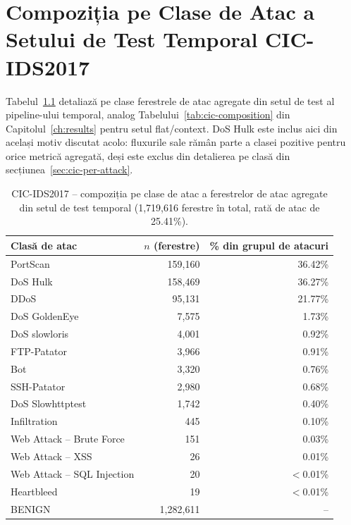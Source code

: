 \chapter{Compoziția pe Clase de Atac a Setului de Test Temporal CIC-IDS2017}
\label{ch:cic-composition-temporal}

Tabelul~\ref{tab:cic-composition-temporal} detaliază pe clase ferestrele de atac agregate din setul de test al pipeline-ului temporal, analog Tabelului~\ref{tab:cic-composition} din Capitolul~\ref{ch:results} pentru setul flat/context. DoS Hulk este inclus aici din același motiv discutat acolo: fluxurile sale rămân parte a clasei pozitive pentru orice metrică agregată, deși este exclus din detalierea pe clasă din secțiunea~\ref{sec:cic-per-attack}.

\begin{table}[H]
\centering
\begin{tabular}{@{}lrr@{}}
\toprule
Clasă de atac & $n$ (ferestre) & \% din grupul de atacuri \\
\midrule
PortScan            & 159{,}160 & 36.42\% \\
DoS Hulk            & 158{,}469 & 36.27\% \\
DDoS                & 95{,}131  & 21.77\% \\
DoS GoldenEye       & 7{,}575   & 1.73\%  \\
DoS slowloris       & 4{,}001   & 0.92\%  \\
FTP-Patator         & 3{,}966   & 0.91\%  \\
Bot                 & 3{,}320   & 0.76\%  \\
SSH-Patator         & 2{,}980   & 0.68\%  \\
DoS Slowhttptest    & 1{,}742   & 0.40\%  \\
Infiltration        & 445       & 0.10\%  \\
Web Attack -- Brute Force & 151 & 0.03\%  \\
Web Attack -- XSS    & 26        & 0.01\%  \\
Web Attack -- SQL Injection & 20 & $<$0.01\% \\
Heartbleed          & 19        & $<$0.01\% \\
\midrule
BENIGN              & 1{,}282{,}611 & -- \\
\bottomrule
\end{tabular}
\caption{CIC-IDS2017 -- compoziția pe clase de atac a ferestrelor de atac agregate din setul de test temporal (1{,}719{,}616 ferestre în total, rată de atac de 25.41\%).}
\label{tab:cic-composition-temporal}
\end{table}



